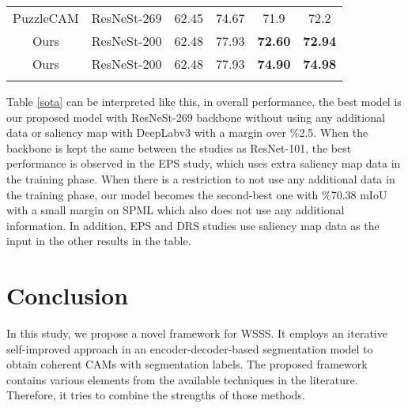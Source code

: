 \documentclass[sn-mathphys]{sn-jnl}
\theoremstyle{thmstyleone}
\theoremstyle{thmstyletwo}\newtheorem{example}{Example}\newtheorem{remark}{Remark}
\theoremstyle{thmstylethree}\newtheorem{definition}{Definition}
\begin{document}
\begin{table}[!ht]
\begin{center}
\begin{minipage}{\textwidth}
\begin{tabular*}{\textwidth}{@{\extracolsep{\fill}}cccccc@{\extracolsep{\fill}}}
PuzzleCAM & ResNeSt-269 & 62.45 & 74.67 & 71.9  & 72.2 \\
Ours\footnotemark[5] & ResNeSt-200 & 62.48 & 77.93 & \textbf{72.60} & \textbf{72.94} \\
Ours\footnotemark[6] & ResNeSt-200 & 62.48 & 77.93 & \textbf{74.90} & \textbf{74.98} \\
\botrule
\end{tabular*}
\end{minipage}
\end{center}
\end{table}

Table \ref{sota} can be interpreted like this, in overall performance, the best model is our proposed model with ResNeSt-269 backbone without using any additional data or saliency map with DeepLabv3 with a margin over \%2.5. When the backbone is kept the same between the studies as ResNet-101, the best performance is observed in the EPS study, which uses extra saliency map data in the training phase. When there is a restriction to not use any additional data in the training phase, our model becomes the second-best one with \%70.38 mIoU with a small margin on SPML which also does not use any additional information. In addition, EPS and DRS studies use saliency map data as the input in the other results in the table.



\section{Conclusion}\label{conclusion}
In this study, we propose a novel framework for WSSS. It employs an iterative self-improved approach in an encoder-decoder-based segmentation model to obtain coherent CAMs with segmentation labels. The proposed framework contains various elements from the available techniques in the literature. Therefore, it tries to combine the strengths of those methods.     
\end{document}
